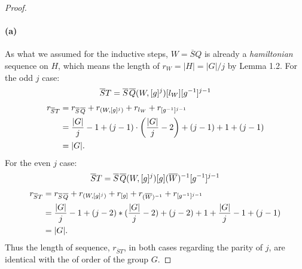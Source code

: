 \documentclass{article}
\begin{document}
\begin{proof}
\paragraph{(a)} As what we assumed for the inductive steps, $W = \overline{S}Q$ is already a \textit{hamiltonian} sequence on $H$, which means the length of $r_W = |H| = |G|/j$ by Lemma 1.2.
For the odd $j$ case:
\[
\overline{S}T = \overline{S} \mkern2mu \overline{Q}(W, [g]^j)[l_W][g^{-1}]^{j-1}
\]
\begin{align*}
r_{\overline{S}T} &= r_{\overline{S} \mkern2mu \overline{Q}} +r_{(W, [g]^j)} + r_{l_W} + r_{[g^{-1}]^{j-1}} \\
                  &= \frac{|G|}{j} - 1 + (j-1) \cdot \left(\frac{|G|}{j} - 2\right) + (j-1) + 1 + (j - 1) \\
                  &= |G|.
\end{align*}
For the even $j$ case:
\[
\overline{S}T = \overline{S}\mkern2mu\overline{Q}(W, [g]^j)[g](\overline{W})^{-1}[g^{-1}]^{j-1}
\]
\begin{align*}
r_{\overline{S}T} &= r_{\overline{S} \mkern2mu \overline{Q}} +r_{(W, [g]^j)} + r_{[g]} + r_{(\overline{W})^{-1}} + r_{[g^{-1}]^{j-1}} \\
                  &= \frac{|G|}{j} - 1 + (j-2)*(\frac{|G|}{j} - 2) + (j-2) + 1 + \frac{|G|}{j} - 1 + (j - 1)\\
                  &= |G|.
\end{align*}
Thus the length of sequence, $r_{\overline{S}T}$, in both cases regarding the parity of $j$, are identical with the of order of the group $G$.


\end{proof}
\end{document}
